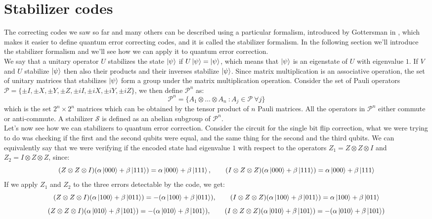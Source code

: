 \documentclass{article}
\begin{document}
	\section{Stabilizer codes}
	The correcting codes we saw so far and many others can be described using a particular formalism, introduced by Gottersman in \cite{Gottesman1997StabilizerCA}, which makes it easier to define quantum error correcting codes, and it is called the stabilizer formalism. In the following section we'll introduce the stabilizer formalism and we'll see how we can apply it to quantum error correction.\\
	We say that a unitary operator $U$ stabilizes the state $\ket{\psi}$ if $U\ket{\psi} = \ket{\psi}$, which means that $\ket{\psi}$ is an eigenstate of $U$ with eigenvalue $1$. If $V$ and $U$ stabilize $\ket{\psi}$ then also their products and their inverses stabilize $\ket{\psi}$. Since matrix multiplication is an associative operation, the set of unitary matrices that stabilizes $\ket{\psi}$ form a group under the matrix multiplication operation. Consider the set of Pauli operators $\mathcal{P} = \{\pm I,\pm X,\pm Y,\pm Z, \pm iI,\pm iX,\pm iY,\pm iZ\}$, we then define $\mathcal{P}^n$ as:
	\[\mathcal{P}^n = \{A_1\otimes \dots \otimes A_n\ \colon A_j \in \mathcal{P}\ \forall j\}\]
	which is the set $2^n\times2^n$ matrices which can be obtained by the tensor product of $n$ Pauli matrices. All the operators in $\mathcal{P}^n$ either commute or anti-commute. A stabilizer $\mathcal{S}$ is defined as an abelian subgroup of $\mathcal{P}^n$.\\
	Let's now see how we can stabilizers to quantum error correction. Consider the circuit for the single bit flip correction, what we were trying to do was checking if the first and the second qubits were equal, and the same thing for the second and the third qubits. We can equivalently say that we were verifying if the encoded state had eigenvalue $1$ with respect to the operators $Z_1 = Z\otimes Z \otimes I$ and $Z_2 = I \otimes Z \otimes Z$, since:
	\[(Z\otimes Z \otimes I)(\alpha\ket{000} + \beta\ket{111}) = \alpha\ket{000} + \beta\ket{111},\qquad (I\otimes Z \otimes Z)(\alpha\ket{000} + \beta\ket{111}) = \alpha\ket{000} + \beta\ket{111}\]
	If we apply $Z_1$ and $Z_2$  to the three errors detectable by the code, we get:
	\[(Z\otimes Z \otimes I)(\alpha\ket{100} + \beta\ket{011}) = -(\alpha\ket{100} + \beta\ket{011}),\qquad (I\otimes Z \otimes Z)(\alpha\ket{100} + \beta\ket{011}) = \alpha\ket{100} + \beta\ket{011}\]
	\[(Z\otimes Z \otimes I)(\alpha\ket{010} + \beta\ket{101}) = -(\alpha\ket{010} + \beta\ket{101}),\qquad (I\otimes Z \otimes Z)(\alpha\ket{010} + \beta\ket{101}) = -(\alpha\ket{010} + \beta\ket{101})\]
\end{document}
